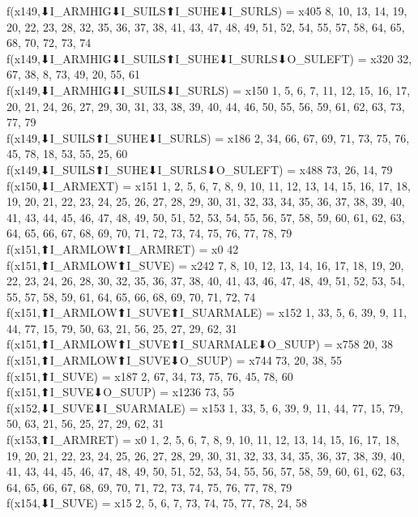 f(x149,⬇I_ARMHIG⬇I_SUILS⬆I_SUHE⬇I_SURLS) = x405 {8, 10, 13, 14, 19, 20, 22, 23, 28, 32, 35, 36, 37, 38, 41, 43, 47, 48, 49, 51, 52, 54, 55, 57, 58, 64, 65, 68, 70, 72, 73, 74} \\
f(x149,⬇I_ARMHIG⬇I_SUILS⬆I_SUHE⬇I_SURLS⬇O_SULEFT) = x320 {32, 67, 38, 8, 73, 49, 20, 55, 61} \\
f(x149,⬇I_ARMHIG⬇I_SUILS⬇I_SURLS) = x150 {1, 5, 6, 7, 11, 12, 15, 16, 17, 20, 21, 24, 26, 27, 29, 30, 31, 33, 38, 39, 40, 44, 46, 50, 55, 56, 59, 61, 62, 63, 73, 77, 79} \\
f(x149,⬇I_SUILS⬆I_SUHE⬇I_SURLS) = x186 {2, 34, 66, 67, 69, 71, 73, 75, 76, 45, 78, 18, 53, 55, 25, 60} \\
f(x149,⬇I_SUILS⬆I_SUHE⬇I_SURLS⬇O_SULEFT) = x488 {73, 26, 14, 79} \\
f(x150,⬇I_ARMEXT) = x151 {1, 2, 5, 6, 7, 8, 9, 10, 11, 12, 13, 14, 15, 16, 17, 18, 19, 20, 21, 22, 23, 24, 25, 26, 27, 28, 29, 30, 31, 32, 33, 34, 35, 36, 37, 38, 39, 40, 41, 43, 44, 45, 46, 47, 48, 49, 50, 51, 52, 53, 54, 55, 56, 57, 58, 59, 60, 61, 62, 63, 64, 65, 66, 67, 68, 69, 70, 71, 72, 73, 74, 75, 76, 77, 78, 79} \\
f(x151,⬆I_ARMLOW⬆I_ARMRET) = x0 {42} \\
f(x151,⬆I_ARMLOW⬆I_SUVE) = x242 {7, 8, 10, 12, 13, 14, 16, 17, 18, 19, 20, 22, 23, 24, 26, 28, 30, 32, 35, 36, 37, 38, 40, 41, 43, 46, 47, 48, 49, 51, 52, 53, 54, 55, 57, 58, 59, 61, 64, 65, 66, 68, 69, 70, 71, 72, 74} \\
f(x151,⬆I_ARMLOW⬆I_SUVE⬆I_SUARMALE) = x152 {1, 33, 5, 6, 39, 9, 11, 44, 77, 15, 79, 50, 63, 21, 56, 25, 27, 29, 62, 31} \\
f(x151,⬆I_ARMLOW⬆I_SUVE⬆I_SUARMALE⬇O_SUUP) = x758 {20, 38} \\
f(x151,⬆I_ARMLOW⬆I_SUVE⬇O_SUUP) = x744 {73, 20, 38, 55} \\
f(x151,⬆I_SUVE) = x187 {2, 67, 34, 73, 75, 76, 45, 78, 60} \\
f(x151,⬆I_SUVE⬇O_SUUP) = x1236 {73, 55} \\
f(x152,⬇I_SUVE⬇I_SUARMALE) = x153 {1, 33, 5, 6, 39, 9, 11, 44, 77, 15, 79, 50, 63, 21, 56, 25, 27, 29, 62, 31} \\
f(x153,⬆I_ARMRET) = x0 {1, 2, 5, 6, 7, 8, 9, 10, 11, 12, 13, 14, 15, 16, 17, 18, 19, 20, 21, 22, 23, 24, 25, 26, 27, 28, 29, 30, 31, 32, 33, 34, 35, 36, 37, 38, 39, 40, 41, 43, 44, 45, 46, 47, 48, 49, 50, 51, 52, 53, 54, 55, 56, 57, 58, 59, 60, 61, 62, 63, 64, 65, 66, 67, 68, 69, 70, 71, 72, 73, 74, 75, 76, 77, 78, 79} \\
f(x154,⬇I_SUVE) = x15 {2, 5, 6, 7, 73, 74, 75, 77, 78, 24, 58} \\
